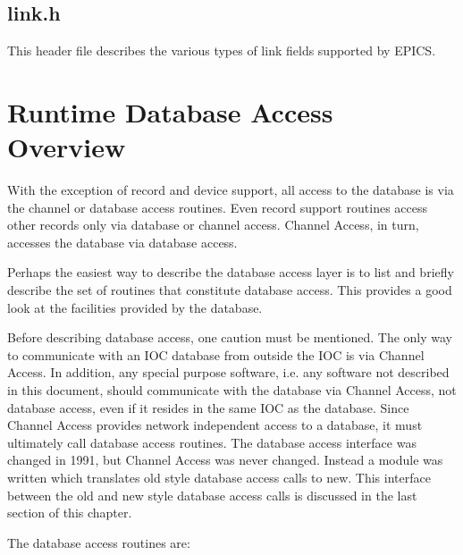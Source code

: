 \subsection{link.h }

This header file describes the various types of link fields supported by EPICS. 

\section{Runtime Database Access Overview}

With the exception of record and device support, all access to the database is via the  channel or database access routines. 
Even record support routines access other records only via database or channel access. Channel Access, in turn, accesses 
the database via database access.

Perhaps the easiest way to describe the database access layer is to list and briefly describe the set of routines that 
constitute database access. This provides a good look at the facilities provided by the database.

Before describing database access, one caution must be mentioned. The only way to communicate with an IOC database 
from outside the IOC is via Channel Access. In addition, any special purpose software, i.e. any software not described in 
this document, should communicate with the database via Channel Access, not database access, even if it resides in the 
same IOC as the database. Since Channel Access provides network independent access to a database, it must ultimately 
call database access routines. The database access interface was changed in 1991, but Channel Access was never changed. 
Instead a module was written which translates old style database access calls to new. This interface between the old and 
new style database access calls is discussed in the last section of this chapter.

The database access routines are:


